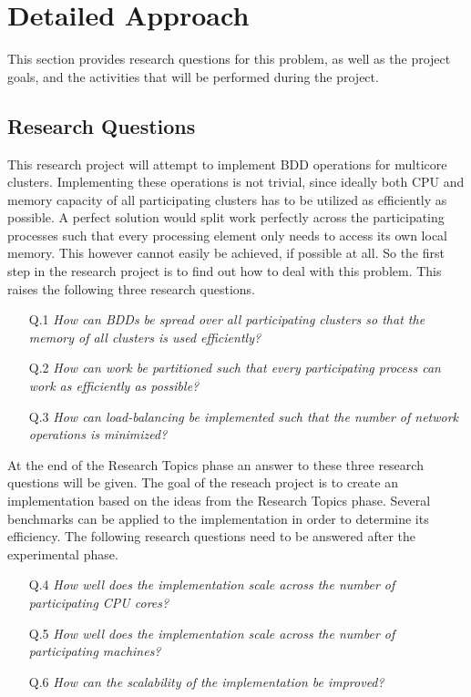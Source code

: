 \chapter{Detailed Approach}
This section provides research questions for this problem, as well as the project goals, and the activities that will be performed during the project.

\section{Research Questions}
This research project will attempt to implement BDD operations for multicore clusters. Implementing these operations is not trivial, since ideally both CPU and memory capacity of all participating clusters has to be utilized as efficiently as possible. A perfect solution would split work perfectly across the participating processes such that every processing element only needs to access its own local memory. This however cannot easily be achieved, if possible at all. So the first step in the research project is to find out how to deal with this problem. This raises the following three research questions.

\begin{enumerate}
	\item[Q.1]{\textit{How can BDDs be spread over all participating clusters so that the memory of all clusters is used efficiently?}}
	\item[Q.2]{\textit{How can work be partitioned such that every participating process can work as efficiently as possible?}}
	\item[Q.3]{\textit{How can load-balancing be implemented such that the number of network operations is minimized?}}
\end{enumerate}

At the end of the Research Topics phase an answer to these three research questions will be given. The goal of the reseach project is to create an implementation based on the ideas from the Research Topics phase. Several benchmarks can be applied to the implementation in order to determine its efficiency. The following research questions need to be answered after the experimental phase.

\begin{enumerate}
	\item[Q.4]{\textit{How well does the implementation scale across the number of participating CPU cores?}}
	\item[Q.5]{\textit{How well does the implementation scale across the number of participating machines?}}
	\item[Q.6]{\textit{How can the scalability of the implementation be improved?}}
\end{enumerate}

